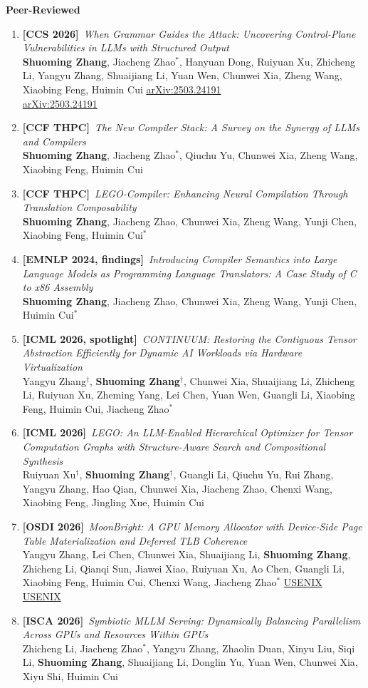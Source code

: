 \documentclass[11pt]{article}
\newcommand{\pub}[4]{%
  \item \textbf{[#1]}\, \emph{#2}\\[0.25ex]
  {\small #3}%
  \ifx\relax#4\relax\else\\[0.25ex]{\small #4}\fi}
\newcommand{\me}{\textbf{Shuoming Zhang}}
\newcommand{\eq}{$^{\dagger}$}
\newcommand{\co}{$^{*}$}
\begin{document}
\textbf{\color{accent}Peer-Reviewed}
\begin{enumerate}[leftmargin=1.6em,itemsep=0.6ex,topsep=0.4ex,label=\arabic*.]
  \pub{CCS 2026}{When Grammar Guides the Attack: Uncovering Control-Plane Vulnerabilities in LLMs with Structured Output}{\me, Jiacheng Zhao\co, Hanyuan Dong, Ruiyuan Xu, Zhicheng Li, Yangyu Zhang, Shuaijiang Li, Yuan Wen, Chunwei Xia, Zheng Wang, Xiaobing Feng, Huimin Cui}{\href{https://arxiv.org/abs/2503.24191}{arXiv:2503.24191}}

  \pub{CCF THPC}{The New Compiler Stack: A Survey on the Synergy of LLMs and Compilers}{\me, Jiacheng Zhao\co, Qiuchu Yu, Chunwei Xia, Zheng Wang, Xiaobing Feng, Huimin Cui}{\relax}

  \pub{CCF THPC}{LEGO-Compiler: Enhancing Neural Compilation Through Translation Composability}{\me, Jiacheng Zhao, Chunwei Xia, Zheng Wang, Yunji Chen, Xiaobing Feng, Huimin Cui\co}{\relax}

  \pub{EMNLP 2024, findings}{Introducing Compiler Semantics into Large Language Models as Programming Language Translators: A Case Study of C to x86 Assembly}{\me, Jiacheng Zhao, Chunwei Xia, Zheng Wang, Yunji Chen, Huimin Cui\co}{\relax}

  \pub{ICML 2026, spotlight}{CONTINUUM: Restoring the Contiguous Tensor Abstraction Efficiently for Dynamic AI Workloads via Hardware Virtualization}{Yangyu Zhang\eq, \me\eq, Chunwei Xia, Shuaijiang Li, Zhicheng Li, Ruiyuan Xu, Zheming Yang, Lei Chen, Yuan Wen, Guangli Li, Xiaobing Feng, Huimin Cui, Jiacheng Zhao\co}{\relax}

  \pub{ICML 2026}{LEGO: An LLM-Enabled Hierarchical Optimizer for Tensor Computation Graphs with Structure-Aware Search and Compositional Synthesis}{Ruiyuan Xu\eq, \me\eq, Guangli Li, Qiuchu Yu, Rui Zhang, Yangyu Zhang, Hao Qian, Chunwei Xia, Jiacheng Zhao, Chenxi Wang, Xiaobing Feng, Jingling Xue, Huimin Cui}{\relax}

  \pub{OSDI 2026}{MoonBright: A GPU Memory Allocator with Device-Side Page Table Materialization and Deferred TLB Coherence}{Yangyu Zhang, Lei Chen, Chunwei Xia, Shuaijiang Li, \me, Zhicheng Li, Qianqi Sun, Jiawei Xiao, Ruiyuan Xu, Ao Chen, Guangli Li, Xiaobing Feng, Huimin Cui, Chenxi Wang, Jiacheng Zhao\co}{\href{https://www.usenix.org/conference/osdi26/presentation/zhang-yangyu}{USENIX}}

  \pub{ISCA 2026}{Symbiotic MLLM Serving: Dynamically Balancing Parallelism Across GPUs and Resources Within GPUs}{Zhicheng Li, Jiacheng Zhao\co, Yangyu Zhang, Zhaolin Duan, Xinyu Liu, Siqi Li, \me, Shuaijiang Li, Donglin Yu, Yuan Wen, Chunwei Xia, Xiyu Shi, Huimin Cui}{\relax}


\end{enumerate}
\end{document}
